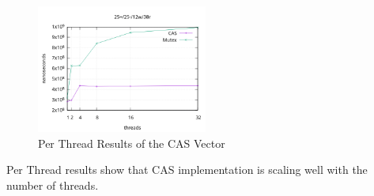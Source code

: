 \documentclass[a4paper, 11pt, twocolumn]{article}
\theoremstyle{nonumberplain}
\begin{document}
\begin{figure}[H]
    \centering
    \includegraphics[width=0.5\textwidth]{res2.png}
    \caption{Per Thread Results of the CAS Vector}
\end{figure}
Per Thread results show that CAS implementation is scaling well with the number
of threads.
\end{document}
